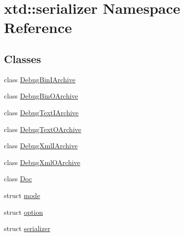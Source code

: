 \hypertarget{namespacextd_1_1serializer}{}\section{xtd\+:\+:serializer Namespace Reference}
\label{namespacextd_1_1serializer}
\subsection*{Classes}
\begin{DoxyCompactItemize}
\item 
class \hyperlink{classxtd_1_1serializer_1_1DebugBinIArchive}{Debug\+Bin\+I\+Archive}
\item 
class \hyperlink{classxtd_1_1serializer_1_1DebugBinOArchive}{Debug\+Bin\+O\+Archive}
\item 
class \hyperlink{classxtd_1_1serializer_1_1DebugTextIArchive}{Debug\+Text\+I\+Archive}
\item 
class \hyperlink{classxtd_1_1serializer_1_1DebugTextOArchive}{Debug\+Text\+O\+Archive}
\item 
class \hyperlink{classxtd_1_1serializer_1_1DebugXmlIArchive}{Debug\+Xml\+I\+Archive}
\item 
class \hyperlink{classxtd_1_1serializer_1_1DebugXmlOArchive}{Debug\+Xml\+O\+Archive}
\item 
class \hyperlink{classxtd_1_1serializer_1_1Doc}{Doc}
\item 
struct \hyperlink{structxtd_1_1serializer_1_1mode}{mode}
\item 
struct \hyperlink{structxtd_1_1serializer_1_1option}{option}
\item 
struct \hyperlink{structxtd_1_1serializer_1_1serializer}{serializer}
\end{DoxyCompactItemize}
